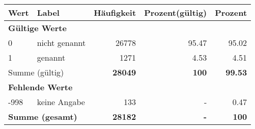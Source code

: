      \begin{longtable}{lXrrr}
     \toprule
     \textbf{Wert} & \textbf{Label} & \textbf{Häufigkeit} & \textbf{Prozent(gültig)} & \textbf{Prozent} \\
     \endhead
     \midrule
     \multicolumn{5}{l}{\textbf{Gültige Werte}}\\

     0 &
     \multicolumn{1}{X}{ nicht genannt   } &


       \num{26778} &
       \num[round-mode=places,round-precision=2]{95,47} &
         \num[round-mode=places,round-precision=2]{95,02} \\

     1 &
     \multicolumn{1}{X}{ genannt   } &


       \num{1271} &
       \num[round-mode=places,round-precision=2]{4,53} &
         \num[round-mode=places,round-precision=2]{4,51} \\
     \midrule
     \multicolumn{2}{l}{Summe (gültig)} &
       \textbf{\num{28049}} &
     \textbf{100} &
       \textbf{\num[round-mode=places,round-precision=2]{99,53}} \\
     \multicolumn{5}{l}{\textbf{Fehlende Werte}}\\
       -998 &
       keine Angabe &
         \num{133} &
        - &
         \num[round-mode=places,round-precision=2]{0,47} \\
     \midrule
     \multicolumn{2}{l}{\textbf{Summe (gesamt)}} &
          \textbf{\num{28182}} &
        \textbf{-} &
        \textbf{100} \\
     \bottomrule
     \end{longtable}
     
